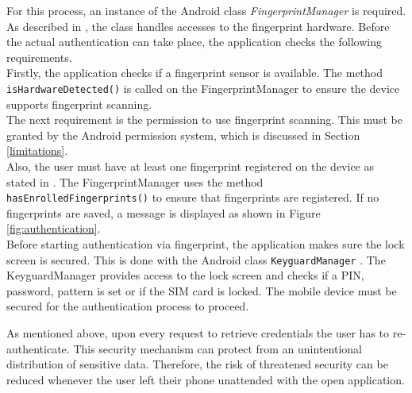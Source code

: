 For this process, an instance of the Android class \textit{FingerprintManager} is required. As described in \cite{FingerprintManager}, the class handles accesses to the fingerprint hardware. Before the actual authentication can take place, the application checks the following requirements. \\
Firstly, the application checks if a fingerprint sensor is available. The method \texttt{isHardwareDetected()} is called on the FingerprintManager to ensure the device supports fingerprint scanning. \\
The next requirement is the permission to use fingerprint scanning. This must be granted by the Android permission system, which is discussed in Section \ref{limitations}. \\
Also, the user must have at least one fingerprint registered on the device as stated in \cite{FingerprintTutorial}. The FingerprintManager uses the method \texttt{hasEnrolledFingerprints()} to ensure that fingerprints are registered. If no fingerprints are saved, a message is displayed as shown in Figure \ref{fig:authentication}\protect{}. \\
Before starting authentication via fingerprint, the application makes sure the lock screen is secured. This is done with the Android class \texttt{KeyguardManager} \cite{KeyguardManager}. The KeyguardManager provides access to the lock screen and checks if a PIN, password, pattern is set or if the SIM card is locked. The mobile device must be secured for the authentication process to proceed.

As mentioned above, upon every request to retrieve credentials the user has to re-authenticate. This security mechanism can protect from an unintentional distribution of sensitive data. Therefore, the risk of threatened security can be reduced whenever the user left their phone unattended with the open application. \\

